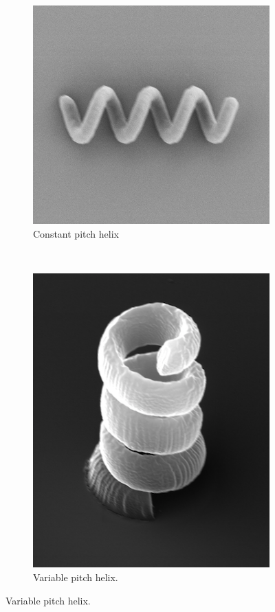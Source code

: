 \documentclass[12pt,a4paper,titlepage]{report}
\begin{document}
\begin{figure}
        \centering

  \begin{subfigure}[b]{0.566\textwidth}
                \includegraphics[width=\textwidth]{constant-pitch}
                \caption{Constant pitch helix}
                \label{constant-pitch}
        \end{subfigure}~
  \begin{subfigure}[b]{0.42\textwidth}
                \includegraphics[width=\textwidth]{variable-pitch1}
                \caption{Variable pitch helix. }
                \label{variable-pitch1}
        \end{subfigure}
      

\end{figure}
\end{document}
